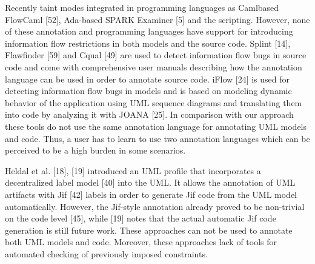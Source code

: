  Recently
taint modes integrated in programming languages as Camlbased FlowCaml [52], Ada-based SPARK Examiner [5] and the scripting. However, none of these annotation and programming languages have support for introducing information flow
restrictions in both models and the source code.
Splint [14], Flawfinder [59] and Cqual [49] are used to
detect information flow bugs in source code and come with
comprehensive user manuals describing how the annotation
language can be used in order to annotate source code.
iFlow [24] is used for detecting information flow bugs in
models and is based on modeling dynamic behavior of the
application using UML sequence diagrams and translating
them into code by analyzing it with JOANA [25]. In comparison with our approach these tools do not use the same
annotation language for annotating UML models and code.
Thus, a user has to learn to use two annotation languages
which can be perceived to be a high burden in some scenarios.


 Heldal et al. [18], [19] introduced an
UML profile that incorporates a decentralized label model [40]
into the UML. It allows the annotation of UML artifacts with
Jif [42] labels in order to generate Jif code from the UML
model automatically. However, the Jif-style annotation already
proved to be non-trivial on the code level [45], while [19]
notes that the actual automatic Jif code generation is still future
work. These approaches can not be used to annotate both UML
models and code. Moreover, these approaches lack of tools for
automated checking of previously imposed constraints.